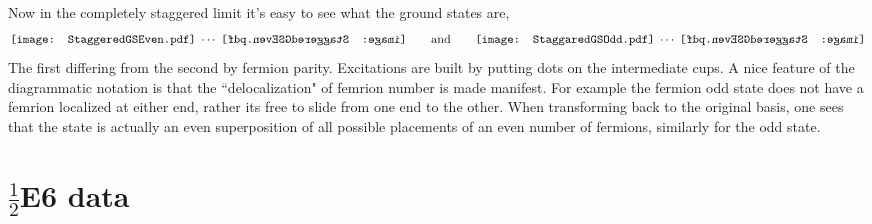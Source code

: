 \documentclass[12pt,a4paper]{article}
\newcommand{\StaggaredGSOdd}{\mathord{\vcenter{\hbox{\texttt{[image: StaggaredGSOdd.pdf]}}}}}
\newcommand{\StaggaredGSEven}{\mathord{\vcenter{\hbox{\texttt{[image: StaggeredGSEven.pdf]}}}}}
\newcommand{\StaggaredGSEvenR}{\mathord{\vcenter{\hbox{\reflectbox{\texttt{[image: StaggeredGSEven.pdf]}}}}}}
\begin{document}
Now in the completely staggered limit it's easy to see what the ground states are,
\begin{align}
\StaggaredGSEven \; \cdots \; \StaggaredGSEvenR  
\qquad \text{and} \qquad 
\StaggaredGSOdd \; \cdots  \; \StaggaredGSEvenR
\end{align}
The first differing from the second by fermion parity.
Excitations are built by putting dots on the intermediate cups. 
A nice feature of the diagrammatic notation is that the ``delocalization" of femrion number is made manifest.
For example the fermion odd state does not have a femrion localized at either end, rather its free to slide from one end to the other.
When transforming back to the original basis, one sees that the state is actually an even superposition of all possible placements of an even number of fermions, similarly for the odd state.

\section{$\frac{1}{2}$E6 data}
\end{document}
